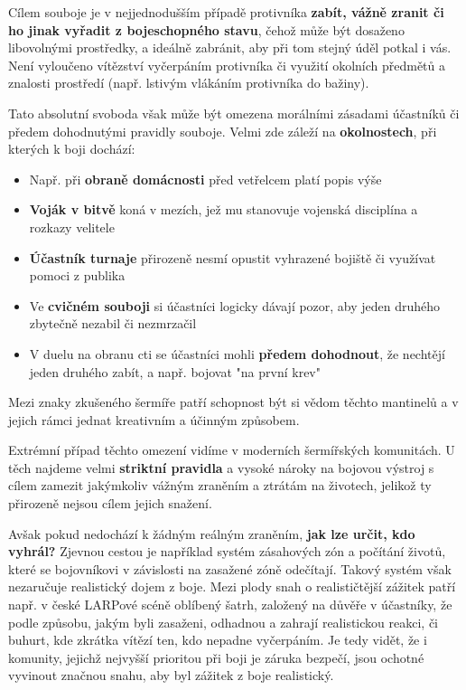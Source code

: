 Cílem souboje je v nejjednodušším případě protivníka \textbf{zabít, vážně zranit či ho jinak vyřadit z bojeschopného stavu}, čehož může být dosaženo libovolnými prostředky, a ideálně zabránit, aby při tom stejný úděl potkal i vás. Není vyloučeno vítězství vyčerpáním protivníka či využití okolních předmětů a znalosti prostředí (např. lstivým vlákáním protivníka do bažiny).

Tato absolutní svoboda však může být omezena morálními zásadami účastníků\cite{HistoryOfSurrender} či předem dohodnutými pravidly souboje. Velmi zde záleží na \textbf{okolnostech}, při kterých k boji dochází:
\begin{itemize}
    \item Např. při \textbf{obraně domácnosti} před vetřelcem platí popis výše
    \item \textbf{Voják v bitvě} koná v mezích, jež mu stanovuje vojenská disciplína a rozkazy velitele
    \item \textbf{Účastník turnaje} přirozeně nesmí opustit vyhrazené bojiště či využívat pomoci z publika
    \item Ve \textbf{cvičném souboji} si účastníci logicky dávají pozor, aby jeden druhého zbytečně nezabil či nezmrzačil
    \item V duelu na obranu cti se účastníci mohli \textbf{předem dohodnout}, že nechtějí jeden druhého zabít, a např. bojovat "na první krev"
\end{itemize}
Mezi znaky zkušeného šermíře patří schopnost být si vědom těchto mantinelů a v jejich rámci jednat kreativním a účinným způsobem.

Extrémní případ těchto omezení vidíme v moderních šermířských komunitách. U těch najdeme velmi \textbf{striktní pravidla} a vysoké nároky na bojovou výstroj s cílem zamezit jakýmkoliv vážným zraněním a ztrátám na životech, jelikož ty přirozeně nejsou cílem jejich snažení. 

Avšak pokud nedochází k žádným reálným zraněním, \textbf{jak lze určit, kdo vyhrál?} Zjevnou cestou je například systém zásahových zón a počítání životů, které se bojovníkovi v závislosti na zasažené zóně odečítají. Takový systém však nezaručuje realistický dojem z boje. Mezi plody snah o realističtější zážitek patří např. v české LARPové scéně oblíbený šatrh\cite{Satrh}, založený na důvěře v účastníky, že podle způsobu, jakým byli zasaženi, odhadnou a zahrají realistickou reakci, či buhurt, kde zkrátka vítězí ten, kdo nepadne vyčerpáním. Je tedy vidět, že i komunity, jejichž nejvyšší prioritou při boji je záruka bezpečí, jsou ochotné vyvinout značnou snahu, aby byl zážitek z boje realistický.


